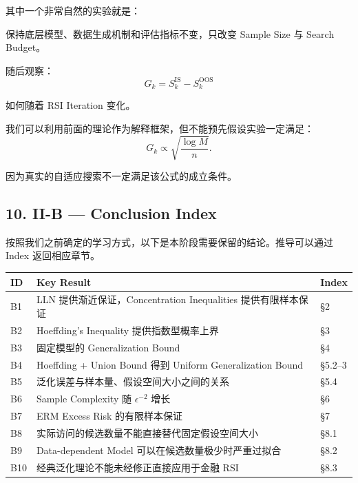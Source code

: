 其中一个非常自然的实验就是：

保持底层模型、数据生成机制和评估指标不变，只改变 Sample Size 与 Search Budget。

随后观察：
\[G_k=S_k^{\mathrm{IS}}-S_k^{\mathrm{OOS}}\]

如何随着 RSI Iteration 变化。

我们可以利用前面的理论作为解释框架，但不能预先假设实验一定满足：
\[G_k\propto
\sqrt{\frac{\log M}{n}}.\]

因为真实的自适应搜索不一定满足该公式的成立条件。

\hypertarget{part-2-14-0001-ii-b-conclusion-index}{%
\subsection{10. II-B --- Conclusion Index}\label{part-2-14-0001-ii-b-conclusion-index}}

按照我们之前确定的学习方式，以下是本阶段需要保留的结论。推导可以通过 Index 返回相应章节。

\begin{readertable}
\begin{longtable}[]{@{}
  >{\raggedright\arraybackslash}p{}
  >{\raggedright\arraybackslash}p{}
  >{\raggedright\arraybackslash}p{}@{}}
\toprule
ID & Key Result & Index \\
\midrule
\endhead
B1 & LLN 提供渐近保证，Concentration Inequalities 提供有限样本保证 & §2 \\
B2 & Hoeffding's Inequality 提供指数型概率上界 & §3 \\
B3 & 固定模型的 Generalization Bound & §4 \\
B4 & Hoeffding + Union Bound 得到 Uniform Generalization Bound & §5.2--3 \\
B5 & 泛化误差与样本量、假设空间大小之间的关系 & §5.4 \\
B6 & Sample Complexity 随 \(\epsilon^{-2}\) 增长 & §6 \\
B7 & ERM Excess Risk 的有限样本保证 & §7 \\
B8 & 实际访问的候选数量不能直接替代固定假设空间大小 & §8.1 \\
B9 & Data-dependent Model 可以在候选数量极少时严重过拟合 & §8.2 \\
B10 & 经典泛化理论不能未经修正直接应用于金融 RSI & §8.3 \\
\bottomrule
\end{longtable}
\end{readertable}

